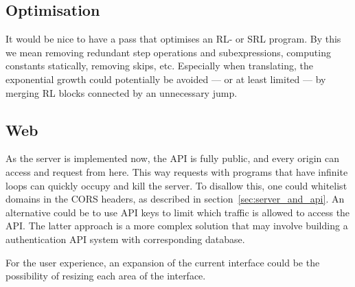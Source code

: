 \subsection{Optimisation}
It would be nice to have a pass that optimises an RL- or SRL program. By this we mean removing redundant step operations and subexpressions, computing constants statically, removing skips, etc. Especially when translating, the exponential growth could potentially be avoided --- or at least limited --- by merging RL blocks connected by an unnecessary jump.

\subsection{Web}
As the server is implemented now, the API is fully public, and every origin can access and request from here. This way requests with programs that have infinite loops can quickly occupy and kill the server. To disallow this, one could whitelist domains in the CORS headers, as described in section~\ref{sec:server_and_api}. An alternative could be to use API keys to limit which traffic is allowed to access the API. The latter approach is a more complex solution that may involve building a authentication API system with corresponding database.

For the user experience, an expansion of the current interface could be the possibility of resizing each area of the interface.

